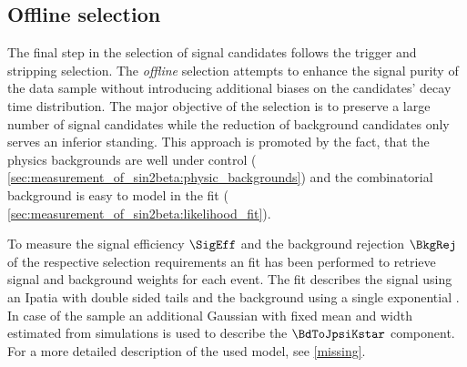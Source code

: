 \subsection{Offline selection}
\label{sec:measurement_of_sin2beta:data_preparation:offline_selection}

The final step in the selection of signal candidates follows the trigger and
stripping selection. The \emph{offline} selection attempts to enhance the signal
purity of the data sample without introducing additional biases on the \Bd
candidates' decay time distribution. The major objective of the selection is to
preserve a large number of signal candidates while the reduction of background
candidates only serves an inferior standing. This approach is promoted by the
fact, that the physics backgrounds are well under control (\cf
\cref{sec:measurement_of_sin2beta:physic_backgrounds}) and the combinatorial
background is easy to model in the fit (\cf
\cref{sec:measurement_of_sin2beta:likelihood_fit}).

To measure the signal efficiency $\SigEff$ and the background rejection
$\BkgRej$ of the respective selection requirements an \sPlot fit
\cite{Pivk:2004ty} has been performed to retrieve signal and background weights
for each event. The fit describes the signal using an Ipatia \PDF
\cite{Santos:2013gra} with double sided tails and the background using a single
exponential \PDF. In case of the \catLL sample an additional Gaussian with fixed
mean and width estimated from \MC simulations is used to describe the
$\BdToJpsiKstar$ component. For a more detailed description of the used model,
see \cref{missing}.

